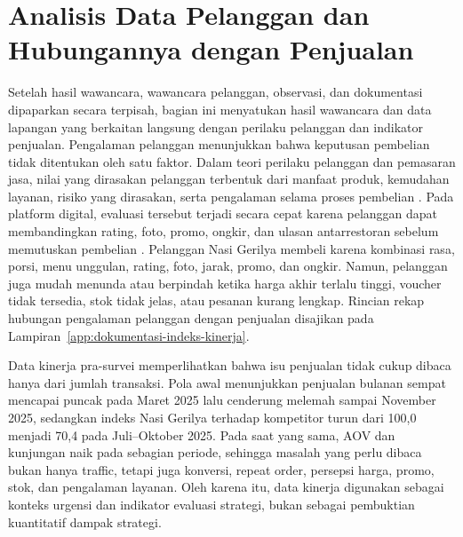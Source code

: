 \section{Analisis Data Pelanggan dan Hubungannya dengan Penjualan}
Setelah hasil wawancara, wawancara pelanggan, observasi, dan dokumentasi dipaparkan secara terpisah, bagian ini menyatukan hasil wawancara dan data lapangan yang berkaitan langsung dengan perilaku pelanggan dan indikator penjualan. Pengalaman pelanggan menunjukkan bahwa keputusan pembelian tidak ditentukan oleh satu faktor. Dalam teori perilaku pelanggan dan pemasaran jasa, nilai yang dirasakan pelanggan terbentuk dari manfaat produk, kemudahan layanan, risiko yang dirasakan, serta pengalaman selama proses pembelian \parencite{kotler2023principlesmarketing,wirtz2024servicesmarketing}. Pada platform digital, evaluasi tersebut terjadi secara cepat karena pelanggan dapat membandingkan rating, foto, promo, ongkir, dan ulasan antarrestoran sebelum memutuskan pembelian \parencite{chaffey2022digitalmarketing}. Pelanggan Nasi Gerilya membeli karena kombinasi rasa, porsi, menu unggulan, rating, foto, jarak, promo, dan ongkir. Namun, pelanggan juga mudah menunda atau berpindah ketika harga akhir terlalu tinggi, voucher tidak tersedia, stok tidak jelas, atau pesanan kurang lengkap. Rincian rekap hubungan pengalaman pelanggan dengan penjualan disajikan pada Lampiran~\ref{app:dokumentasi-indeks-kinerja}.

Data kinerja pra-survei memperlihatkan bahwa isu penjualan tidak cukup dibaca hanya dari jumlah transaksi. Pola awal menunjukkan penjualan bulanan sempat mencapai puncak pada Maret 2025 lalu cenderung melemah sampai November 2025, sedangkan indeks Nasi Gerilya terhadap kompetitor turun dari 100,0 menjadi 70,4 pada Juli--Oktober 2025. Pada saat yang sama, AOV dan kunjungan naik pada sebagian periode, sehingga masalah yang perlu dibaca bukan hanya traffic, tetapi juga konversi, repeat order, persepsi harga, promo, stok, dan pengalaman layanan. Oleh karena itu, data kinerja digunakan sebagai konteks urgensi dan indikator evaluasi strategi, bukan sebagai pembuktian kuantitatif dampak strategi.

